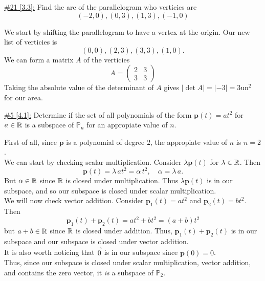 \documentclass{exam}
\begin{document}
\underline{\#21 [3.3]:} Find the are of the parallelogram who verticies are
\[
    (-2,0), (0, 3), (1, 3), (-1, 0)
\]
\begin{solution}
    We start by shifting the parallelogram to have a vertex at the origin. Our new list of verticies is 
    \[
        (0, 0), (2, 3), (3, 3), (1, 0).
    \]
    We can form a matrix $A$ of the verticies 
    \[
        A = \begin{pmatrix}
            2 & 3 \\
            3 & 3
        \end{pmatrix} 
    \]
    Taking the absolute value of the determinant of $A$ gives $|\det A| = |-3| = 3\text{un}^2$ for our area. 
\end{solution}

\underline{\#5 [4.1]:} Determine if the set of all polynomials of the form $\mathbf{p}(t) = at^2$ for $a \in \mathbb R$ is a subspace of $\mathbb{P}_n$ for an appropiate value of $n$. 
\begin{solution}
    First of all, since $\mathbf{p}$ is a polynomial of degree $2$, the appropiate value of $n$ is $n=2$. \\ We can start by checking scalar multiplication. Consider $\lambda\mathbf{p}\left(t\right)$ for $\lambda \in \mathbb R$. Then 
    \[
        \mathbf{p}\left(t\right) = \lambda\,at^{2} = \alpha\,t^{2}, \quad \alpha = \lambda\,a.
    \]
    But $\alpha \in \mathbb R$ since $\mathbb R$ is closed under multiplication. Thus $\lambda\mathbf{p}(t)$ is in our subspace, and so our subspace is closed under scalar multiplication. \\ We will now check vector addition. Consider $\mathbf{p}_1(t) = at^2$ and $\mathbf{p}_2(t) = bt^2$. Then 
    \[
        \mathbf{p}_1(t) + \mathbf{p}_2(t) = at^2 + bt^2 = \left(a+b\right)t^2
    \]
    but $a+b \in \mathbb R$ since $\mathbb R$ is closed under addition. Thus, $\mathbf{p}_1(t) + \mathbf{p}_2(t)$ is in our subspace and our subspace is closed under vector addition. \\ It is also worth noticing that $\vec{0}$ is in our subspace since $\mathbf{p}\left(0\right) = 0$. \\ Thus, since our subspace is closed under scalar multiplication, vector addition, and contains the zero vector, it \textit{is} a subspace of $\mathbb{P}_2$.
\end{solution}
\end{document}
